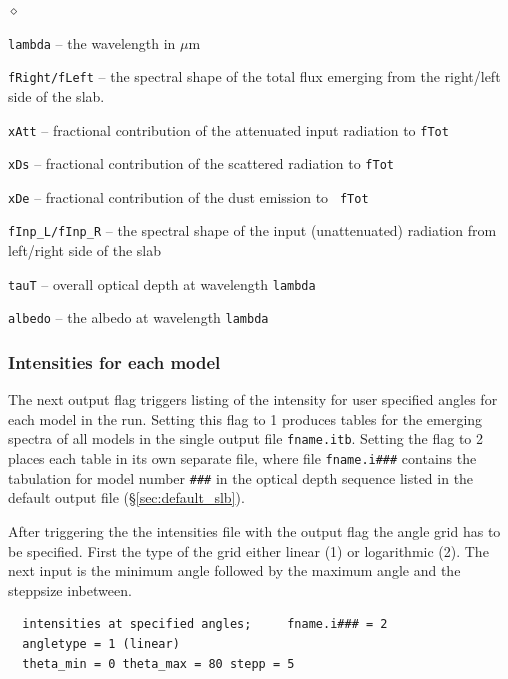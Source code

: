 \documentclass[11pt]{article}
\def\E#1{\hbox{$10^{#1}$}}
\def\mic    {\hbox{$\mu$m}}
\begin{document}
\begin{list}{$\diamond$}{}
\item {\tt lambda} -- the wavelength in \mic
\item {\tt fRight/fLeft} -- the spectral shape of the total flux emerging from
  the right/left side of the slab.
%
\item{\tt xAtt} -- fractional contribution of the attenuated input
  radiation to {\tt fTot}
\item{\tt xDs} -- fractional contribution of the scattered radiation
  to {\tt fTot}
\item{\tt xDe} -- fractional contribution of the dust emission to {\tt
    fTot}
\item{\tt fInp\_L/fInp\_R} -- the spectral shape of the input
  (unattenuated) radiation from left/right side of the slab
\item{\tt tauT} -- overall optical depth at wavelength {\tt lambda}
\item{\tt albedo} -- the albedo at wavelength {\tt lambda}
\end{list}

\subsubsection{Intensities for each model }
\label{sec:inten_slb}

The next output flag triggers listing of the intensity for user
specified angles for each model in the run.  Setting this flag to 1
produces tables for the emerging spectra of all models in the single
output file {\tt fname.itb}.  Setting the flag to 2 places each table
in its own separate file, where file {\tt fname.i\#\#\#} contains the
tabulation for model number {\tt \#\#\#} in the optical depth sequence
listed in the default output file (\S\ref{sec:default_slb}).

After triggering the the intensities file with the output flag the
angle grid has to be specified. First the type of the grid either
linear (1) or logarithmic (2). The next input is the minimum angle
followed by the maximum angle and the steppsize inbetween.

\begin{verbatim}
  intensities at specified angles;     fname.i### = 2
  angletype = 1 (linear)
  theta_min = 0 theta_max = 80 stepp = 5
\end{verbatim}
\end{document}
